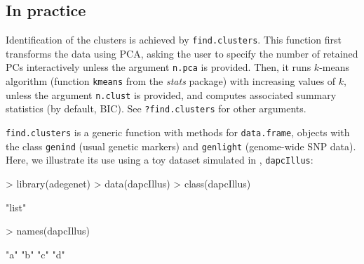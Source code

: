 \documentclass{article}
\newcommand{\code}[1]{{{\tt #1}}}
\begin{document}
\subsection{In practice}

Identification of the clusters is achieved by \code{find.clusters}. This function first transforms
the data using PCA, asking the user to specify the number of retained PCs interactively unless the
argument \code{n.pca} is provided. Then, it runs $k$-means algorithm (function \code{kmeans} from
the \textit{stats} package) with increasing values of $k$, unless the argument  \code{n.clust} is
provided, and computes associated summary statistics (by default, BIC).
See \code{?find.clusters} for other arguments.

\code{find.clusters} is a generic function with methods for \texttt{data.frame}, objects with
the class \texttt{genind} (usual genetic markers) and \texttt{genlight} (genome-wide SNP data).
Here, we illustrate its use using a toy dataset simulated in \cite{tjart19}, \texttt{dapcIllus}:
\begin{Schunk}
\begin{Sinput}
> library(adegenet)
> data(dapcIllus)
> class(dapcIllus)
\end{Sinput}
\begin{Soutput}
[1] "list"
\end{Soutput}
\begin{Sinput}
> names(dapcIllus)
\end{Sinput}
\begin{Soutput}
[1] "a" "b" "c" "d"
\end{Soutput}
\end{Schunk}
\end{document}

